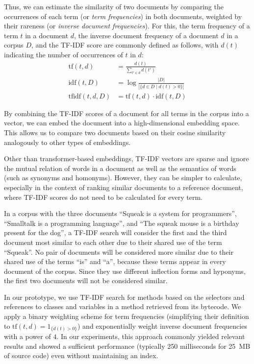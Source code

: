 Thus, we can estimate the similarity of two documents by comparing the occurrences of each term (or \emph{term frequencies}) in both documents, weighted by their rareness (or \emph{inverse document frequencies}).
For this, the term frequency of a term $t$ in a document $d$, the inverse document frequency of a document $d$ in a corpus $D$, and the TF-IDF score are commonly defined as follows, with $d(t)$ indicating the number of occurrences of $t$ in $d$:
\begin{align}
	\text{tf}(t, d)	&= \frac{d(t)}{\sum_{t' \in d} d(t')} \\
	\text{idf}(t, D)	&= \log \frac{|D|}{|\{d \in D \mid d(t) > 0\}|} \\
	\text{tfidf}(t, d, D)	&= \text{tf}(t, d) \cdot \text{idf}(t, D)
\end{align}

By combining the TF-IDF scores of a document for all terms in the corpus into a vector, we can embed the document into a high-dimensional embedding space.
This allows us to compare two documents based on their cosine similarity analogously to other types of embeddings.

Other than transformer-based embeddings, TF-IDF vectors are sparse and ignore the mutual relation of words in a document as well as the semantics of words (such as synonyms and homonyms).
However, they can be simpler to calculate, especially in the context of ranking similar documents to a reference document, where TF-IDF scores do not need to be calculated for every term.

\begin{example}
	In a corpus with the three documents ``Squeak is a system for programmers'', ``Smalltalk is a programming language'', and ``The squeak mouse is a birthday present for the dog'', a TF-IDF search will consider the first and the third document most similar to each other due to their shared use of the term ``Squeak''.
	No pair of documents will be considered more similar due to their shared use of the terms ``is'' and ``a'', because these terms appear in every document of the corpus.
	Since they use different inflection forms and hyponyms, the first two documents will not be considered similar.
\end{example}

In our prototype, we use TF-IDF search for methods based on the selectors and references to classes and variables in a method retrieved from its bytecode.
We apply a binary weighting scheme for term frequencies (simplifying their definition to $\text{tf}(t, d) = 1_{\{d(t) > 0\}}$) and exponentially weight inverse document frequencies with a power of $4$.
In our experiments, this approach commonly yielded relevant results and showed a sufficient performance (typically 250 milliseconds for \qty{25}{MB} of source code) even without maintaining an index.

